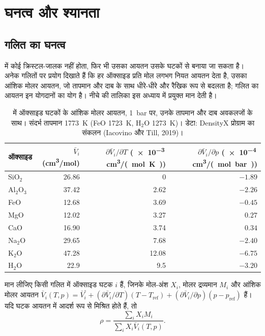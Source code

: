 \section{घनत्व और श्यानता}

\subsection{गलित का घनत्व}

 में कोई क्रिस्टल-जालक नहीं होता, फिर भी उसका आयतन
उसके घटकों से बनाया जा सकता है। अनेक गलितों पर प्रयोग दिखाते हैं कि हर ऑक्साइड
प्रति मोल लगभग नियत आयतन देता है, उसका आंशिक मोलर आयतन, जो
तापमान और दाब के साथ धीरे-धीरे और रैखिक रूप से बदलता है; गलित का आयतन
इन योगदानों का योग है। नीचे की तालिका इस अध्याय में प्रयुक्त मान देती है।

\begin{table}[ht]
\centering\small
\begin{tabular}{lrrr}
\hline
ऑक्साइड & $\bar V_i$ (\unit{cm^3/mol}) & $\partial\bar V_i/\partial T$ (\num{e-3}\,\unit{cm^3/(mol.K)}) & $\partial\bar V_i/\partial p$ (\num{e-4}\,\unit{cm^3/(mol.bar)}) \\
\hline
SiO$_2$  & 26.86 & 0     & $-1.89$ \\
Al$_2$O$_3$ & 37.42 & 2.62 & $-2.26$ \\
FeO      & 12.68 & 3.69  & $-0.45$ \\
MgO      & 12.02 & 3.27  & $0.27$ \\
CaO      & 16.90 & 3.74  & $0.34$ \\
Na$_2$O  & 29.65 & 7.68  & $-2.40$ \\
K$_2$O   & 47.28 & 12.08 & $-6.75$ \\
H$_2$O   & 22.9  & 9.5   & $-3.20$ \\
\hline
\end{tabular}
\caption{ में ऑक्साइड घटकों के आंशिक मोलर आयतन,
\qty{1}{bar} पर, उनके तापमान और दाब अवकलजों के साथ। संदर्भ
तापमान \qty{1773}{K} (FeO \qty{1723}{K}, H$_2$O \qty{1273}{K})। डेटा:
DensityX प्रोग्राम का संकलन (Iacovino और Till, 2019)।}
\label{tab:b2:magma-emplacement:volumes}
\end{table}

\begin{proposition}[सिलिकेट गलित का घनत्व]\label{prop:b2:magma-emplacement:density}
मान लीजिए किसी गलित में ऑक्साइड घटक $i$ हैं, जिनके मोल-अंश $X_i$, मोलर द्रव्यमान
$M_i$ और आंशिक मोलर आयतन $\bar V_i(T, p) = \bar V_i^{\circ} + (\partial\bar
V_i/\partial T)(T - T_{\mathrm{ref}}) + (\partial\bar V_i/\partial p)(p - p_{\mathrm{ref}})$ हैं।
यदि घटक आयतन में आदर्श रूप से मिश्रित होते हैं, तो
\[
\rho = \frac{\sum_i X_i M_i}{\sum_i X_i \bar V_i(T,p)}.
\]
\end{proposition}

